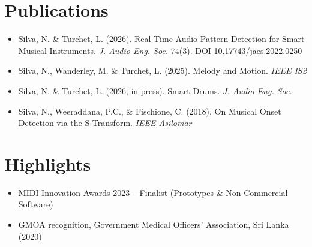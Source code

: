\documentclass[11pt]{article}
\begin{document}
\section*{Publications}
\begin{itemize}[leftmargin=2em, itemsep=-0.3em, topsep=0em]
\item Silva, N. \& Turchet, L. (2026). Real-Time Audio Pattern Detection for Smart Musical Instruments. \textit{J. Audio Eng. Soc.} 74(3). DOI 10.17743/jaes.2022.0250
\item Silva, N., Wanderley, M. \& Turchet, L. (2025). Melody and Motion. \textit{IEEE IS2}
\item Silva, N. \& Turchet, L. (2026, in press). Smart Drums. \textit{J. Audio Eng. Soc.}
\item Silva, N., Weeraddana, P.C., \& Fischione, C. (2018). On Musical Onset Detection via the S-Transform. \textit{IEEE Asilomar}
\end{itemize}

\section*{Highlights}
\begin{itemize}[leftmargin=2em, itemsep=-0.3em, topsep=0em]
\item MIDI Innovation Awards 2023 -- Finalist (Prototypes \& Non-Commercial Software)
\item GMOA recognition, Government Medical Officers' Association, Sri Lanka (2020)
\end{itemize}
\end{document}
